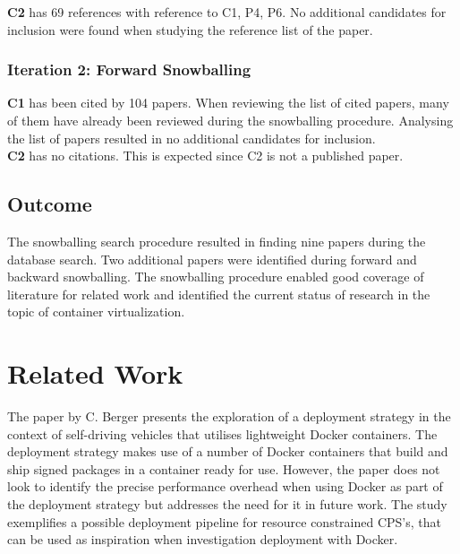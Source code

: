 \textbf{C2} has 69 references with reference to C1, P4, P6. No additional candidates for inclusion were found when studying the reference list of the paper.

\subsubsection*{Iteration 2: Forward Snowballing}
\textbf{C1} has been cited by 104 papers. When reviewing the list of cited papers, many of them have already been reviewed during the snowballing procedure.  Analysing the list of papers resulted in no additional candidates for inclusion.\\ 
 
\textbf{C2} has no citations. This is expected since C2 is not a published paper. 


\subsection{Outcome}
The snowballing search procedure resulted in finding nine papers during the database search. Two additional papers were identified during forward and backward snowballing. The snowballing procedure enabled good coverage of literature for related work and identified the current status of research in the topic of container virtualization. 


\section{Related Work} 


The paper by C. Berger \cite{cberger} presents the exploration of a deployment strategy in the context of self-driving vehicles that utilises lightweight Docker containers. The deployment strategy makes use of a number of Docker containers that build and ship signed packages in a container ready for use. However, the paper does not look to identify the precise performance overhead when using Docker as part of the deployment strategy but addresses the need for it in future work. The study exemplifies a possible deployment pipeline for resource constrained CPS's, that can be used as inspiration when investigation deployment with Docker.\\


